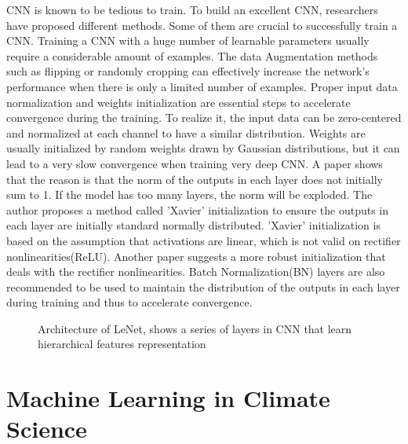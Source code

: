 CNN is known to be tedious to train. To build an excellent CNN, researchers have proposed different methods. Some of them are crucial to successfully train a CNN. Training a CNN with a huge number of learnable parameters usually require a considerable amount of examples. The data Augmentation methods such as flipping or randomly cropping can effectively increase the network's performance when there is only a limited number of examples. Proper input data normalization and weights initialization are essential steps to accelerate convergence during the training. To realize it, the input data can be zero-centered and normalized at each channel to have a similar distribution. Weights are usually initialized by random weights drawn by Gaussian distributions\cite{krizhevsky2012imagenet}, but it can lead to a very slow convergence when training very deep CNN. A paper\cite{glorot2010understanding} shows that the reason is that the norm of the outputs in each layer does not initially sum to 1. If the model has too many layers, the norm will be exploded. The author proposes a method called 'Xavier' initialization to ensure the outputs in each layer are initially standard normally distributed. 'Xavier' initialization is based on the assumption that activations are linear, which is not valid on rectifier nonlinearities(ReLU). Another paper\cite{he2015delving} suggests a more robust initialization that deals with the rectifier nonlinearities. Batch Normalization(BN) layers are also recommended to be used to maintain the distribution of the outputs in each layer during training and thus to accelerate convergence\cite{krizhevsky2012imagenet}. 


\begin{figure}
	\begin{center}
		\hsize {}
	\end{center}
	\caption{Architecture of LeNet, shows a series of layers in CNN that learn hierarchical features representation \cite{lecun1998gradient} }
	\label{fig:LeNet}
\end{figure}

\section{Machine Learning in Climate Science}

